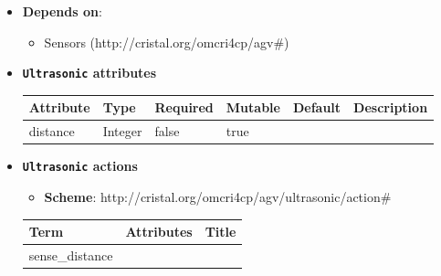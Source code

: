 \begin{itemize}
\item \textbf{Depends on}:
\begin{itemize}
	\item Sensors (http://cristal.org/omcri4cp/agv\#)
\end{itemize}
\end{itemize}

\begin{itemize}
\item \textbf{\texttt{Ultrasonic} attributes}

\begin{tabularx}{\textwidth}{|l|l|p{1.4cm}|p{1.3cm}|l|X|}
  \hline
  \textbf{Attribute} & \textbf{Type} & \textbf{Required} & \textbf{Mutable} & \textbf{Default} & \textbf{Description} \\
  \hline  
  distance & Integer & false & true &  &  \\
  \hline
\end{tabularx}
\end{itemize}

\begin{itemize}
\item \textbf{\texttt{Ultrasonic} actions}

\begin{itemize}
	\item \textbf{Scheme}: http://cristal.org/omcri4cp/agv/ultrasonic/action\#
\end{itemize}

\begin{center}
\begin{tabular}{|l|l|l|}
  \hline
  \textbf{Term}  & \textbf{Attributes} & \textbf{Title} \\
  \hline  
  sense\_distance & &  \\
  \hline
\end{tabular}
\end{center}
\end{itemize}

 
